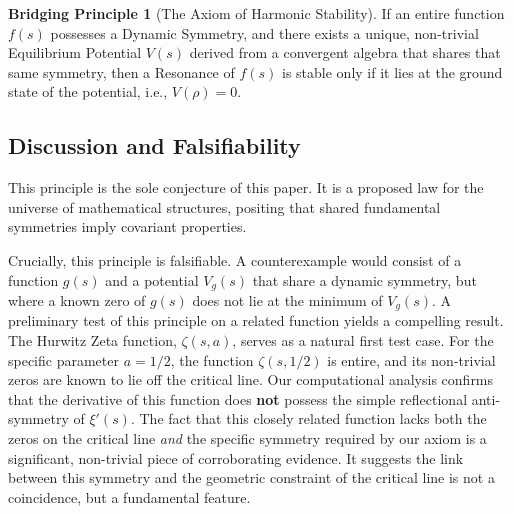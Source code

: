 \documentclass{article}
\theoremstyle{plain}
\theoremstyle{definition}
\newtheorem{conjecture}[theorem]{Bridging Principle}
\theoremstyle{remark}
\begin{document}
\begin{conjecture}[The Axiom of Harmonic Stability]
\label{conj:stability}
If an entire function $f(s)$ possesses a Dynamic Symmetry, and there exists a unique, non-trivial Equilibrium Potential $V(s)$ derived from a convergent algebra that shares that same symmetry, then a Resonance of $f(s)$ is stable only if it lies at the ground state of the potential, i.e., $V(\rho)=0$.
\end{conjecture}

\subsection{Discussion and Falsifiability}
This principle is the sole conjecture of this paper. It is a proposed law for the universe of mathematical structures, positing that shared fundamental symmetries imply covariant properties.

Crucially, this principle is falsifiable. A counterexample would consist of a function $g(s)$ and a potential $V_g(s)$ that share a dynamic symmetry, but where a known zero of $g(s)$ does not lie at the minimum of $V_g(s)$. A preliminary test of this principle on a related function yields a compelling result. The Hurwitz Zeta function, $\zeta(s, a)$, serves as a natural first test case. For the specific parameter $a=1/2$, the function $\zeta(s, 1/2)$ is entire, and its non-trivial zeros are known to lie off the critical line. Our computational analysis confirms that the derivative of this function does \textbf{not} possess the simple reflectional anti-symmetry of $\xi'(s)$. The fact that this closely related function lacks both the zeros on the critical line \textit{and} the specific symmetry required by our axiom is a significant, non-trivial piece of corroborating evidence. It suggests the link between this symmetry and the geometric constraint of the critical line is not a coincidence, but a fundamental feature.
\end{document}
